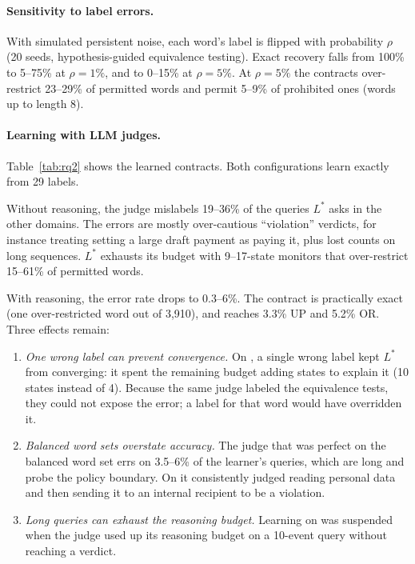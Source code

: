 \paragraph{Sensitivity to label errors.}
With simulated persistent noise, each word's label is flipped with probability $\rho$ (20 seeds, hypothesis-guided
equivalence testing). Exact recovery falls from 100\% to 5--75\% at $\rho=1\%$, and to 0--15\% at $\rho=5\%$. At
$\rho=5\%$ the contracts over-restrict 23--29\% of permitted words and permit 5--9\% of prohibited ones (words up to
length 8).

\paragraph{Learning with LLM judges.}
Table~\ref{tab:rq2} shows the learned contracts. Both configurations learn  exactly from 29 labels.

Without reasoning, the judge mislabels 19--36\% of the queries $L^*$ asks in the other domains. The errors are mostly
over-cautious ``violation'' verdicts, for instance treating setting a large draft payment as paying it, plus lost counts
on long sequences. $L^*$ exhausts its budget with 9--17-state monitors that over-restrict 15--61\% of permitted words.

With reasoning, the error rate drops to 0.3--6\%. The  contract is practically exact (one over-restricted
word out of 3{,}910), and  reaches 3.3\% UP and 5.2\% OR. Three effects remain:
\begin{enumerate}
  \item \emph{One wrong label can prevent convergence.} On , a single wrong label kept $L^*$ from
  converging: it spent the remaining budget adding states to explain it (10 states instead of 4). Because the same
  judge labeled the equivalence tests, they could not expose the error; a label for that word would have overridden it.
  \item \emph{Balanced word sets overstate accuracy.} The judge that was perfect on the balanced word set errs on
  3.5--6\% of the learner's queries, which are long and probe the policy boundary. On  it consistently
  judged reading personal data and then sending it to an internal recipient to be a violation.
  \item \emph{Long queries can exhaust the reasoning budget.} Learning on  was suspended when the judge
  used up its reasoning budget on a 10-event query without reaching a verdict.
\end{enumerate}

